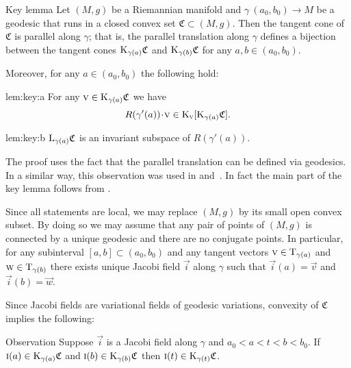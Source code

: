 \documentclass[a4paper,10pt]{article}
\begin{document}
\begin{thm}{Key lemma}\label{lem:key}
Let $(M,g)$ be a Riemannian manifold and $\gamma\:(a_0,b_0)\to M$ be a geodesic that runs in a closed convex set $\mathfrak{C}\subset (M,g)$.
Then the tangent cone of $\mathfrak{C}$ is parallel along $\gamma$; that is, the parallel translation along $\gamma$ defines a bijection between the tangent cones $\mathrm{K}_{\gamma(a)}\mathfrak{C}$ and $\mathrm{K}_{\gamma(b)}\mathfrak{C}$ for any $a,b \in (a_0,b_0)$.

Moreover, for any $a\in (a_0,b_0)$ the following hold:
\begin{subthm}{lem:key:a}
For any $\text{\sc{v}}\in \mathrm{K}_{\gamma(a)}\mathfrak{C}$ we have
\[R(\gamma'(a))\cdot \vec{v}\in \K_\vec{v}[\K_{\gamma(a)}\mathfrak{C}].\]
\end{subthm}

\begin{subthm}{lem:key:b} 
$\mathrm{L}_{\gamma(a)}\mathfrak{C}$ is an invariant subspace of $R(\gamma'(a))$.
\end{subthm}

\end{thm}

The proof uses the fact that the parallel translation can be defined via geodesics.
In a similar way, this observation was used in \cite[Section 13]{Ber-Nik} and~\cite{Petruninpar}.
In fact the main part of the key lemma follows {\color{red} from} %
\cite{Petruninpar}.

Since {\color{red} all 
	 statements} are local, we may replace $(M,g)$ by its small open convex subset.
By doing so we may assume that any pair of points of $(M,g)$ {\color{red} is  } connected by a unique geodesic and {\color{red} there are } no conjugate points.
In particular, for any subinterval $[a,b]\subset (a_0,b_0)$ and any tangent vectors $\text{\sc{v}} \in \mathrm{T}_{\gamma (a)}$ and $\text{\sc{w}} \in \mathrm{T}_{\gamma (b)}$ there exists unique Jacobi field $\vec{i}$ along $\gamma$ 
such that $\vec{i}(a)=\vec{v}$ and $\vec{i}(b)=\vec{w}$.

Since Jacobi fields are variational fields of geodesic variations, {\color{red} 
	convexity  } of $\mathfrak{C}$ implies the following: 

\begin{thm}{Observation}
Suppose $\vec{i}$ is a Jacobi field along %
$\gamma$ and $a_0<a<t<b<b_0$.
If 
$\text{\sc{i}}(a)\in \mathrm{K}_{\gamma(a)}\mathfrak{C}$ and $\text{\sc{i}}(b)\in \mathrm{K}_{\gamma(b)}\mathfrak{C}$
then $\text{\sc{i}}(t)\in \mathrm{K}_{\gamma(t)}\mathfrak{C}$.
\end{thm}%
\end{document}
